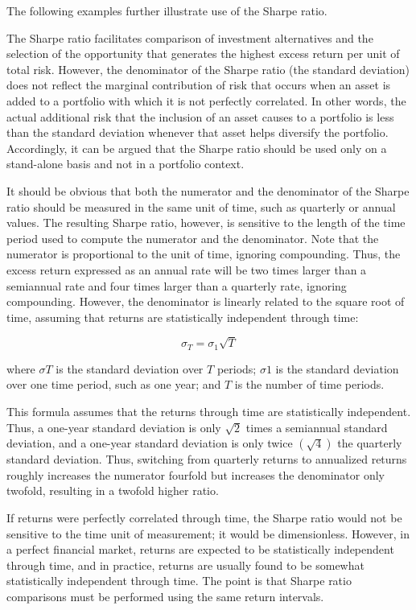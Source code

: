 \documentclass[11pt]{article}
\begin{document}
The following examples further illustrate use of the Sharpe ratio.

The Sharpe ratio facilitates comparison of investment alternatives and the selection of the opportunity that generates the highest excess return per unit of total risk. However, the denominator of the Sharpe ratio (the standard deviation) does not reflect the marginal contribution of risk that occurs when an asset is added to a portfolio with which it is not perfectly correlated. In other words, the actual additional risk that the inclusion of an asset causes to a portfolio is less than the standard deviation whenever that asset helps diversify the portfolio. Accordingly, it can be argued that the Sharpe ratio should be used only on a stand-alone basis and not in a portfolio context.

It should be obvious that both the numerator and the denominator of the Sharpe ratio should be measured in the same unit of time, such as quarterly or annual values. The resulting Sharpe ratio, however, is sensitive to the length of the time period used to compute the numerator and the denominator. Note that the numerator is proportional to the unit of time, ignoring compounding. Thus, the excess return expressed as an annual rate will be two times larger than a semiannual rate and four times larger than a quarterly rate, ignoring compounding. However, the denominator is linearly related to the square root of time, assuming that returns are statistically independent through time:


\begin{equation*}
\sigma_{T}=\sigma_{1} \sqrt{T} \tag{2}
\end{equation*}


where $\sigma T$ is the standard deviation over $T$ periods; $\sigma 1$ is the standard deviation over one time period, such as one year; and $T$ is the number of time periods.

This formula assumes that the returns through time are statistically independent. Thus, a one-year standard deviation is only $\sqrt{2}$ times a semiannual standard deviation, and a one-year standard deviation is only twice $(\sqrt{4})$ the quarterly standard deviation. Thus, switching from quarterly returns to annualized returns roughly increases the numerator fourfold but increases the denominator only twofold, resulting in a twofold higher ratio.

If returns were perfectly correlated through time, the Sharpe ratio would not be sensitive to the time unit of measurement; it would be dimensionless. However, in a perfect financial market, returns are expected to be statistically independent through time, and in practice, returns are usually found to be somewhat statistically independent through time. The point is that Sharpe ratio comparisons must be performed using the same return intervals.
\end{document}
